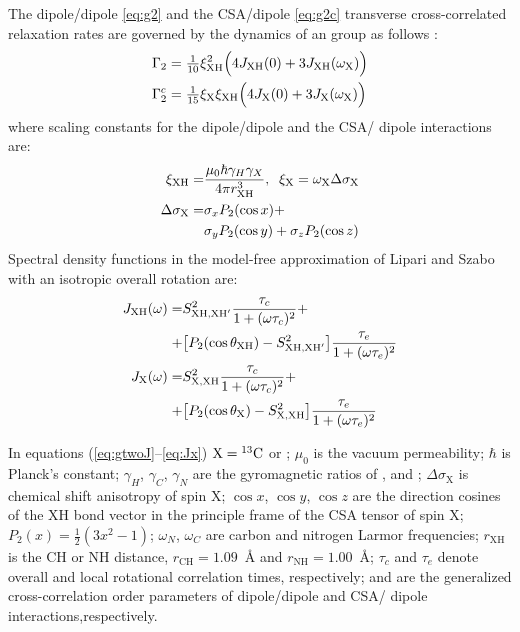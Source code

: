 \documentclass[twocolumn]{svjour3}           %
\begin{document}
The dipole\slash dipole \gtwo{} \eqref{eq:g2} and the 
CSA\slash dipole \gtwoCSA{} \eqref{eq:g2c} transverse 
cross-correlated relaxation rates are governed by the dynamics of an 
\XHtwo{} group as follows 
\cite{yang_study_1998,kumar_cross-correlations_2000,banci_side_2001,zheng_measurement_2004,yang_probing_2011}:
\begin{align}
  \label{eq:gtwoJ}
  \Gamma_2  & = 
    \tfrac{1}{10} \xi_\text{XH}^2
       \Bigl(4 J_{\text{XH}}(0) + 3 J_{\text{XH}}(\omega_\text{X} ) \Bigr )  \\
  \label{eq:gtwoCSAJ}
  \Gamma_2^c & = \tfrac{1}{15} \xi_\text{X} \xi_\text{XH}
    \Bigl(4 J_{\text{X}}(0) + 3 J_{\text{X}}(\omega_\text{X} ) \Bigr )
\end{align}
where scaling constants for the dipole\slash dipole and the CSA\slash 
dipole interactions are:
\begin{align}
  \xi_\text{XH} = &  
     \frac{\mu_0 \hbar \gamma_H \gamma_X }{4 \pi r_\text{XH}^3 }, 
  \thickspace\thickspace 
      \xi_\text{X} = \omega_\text{X} \Delta \sigma_\text{X} \\
  \Delta\sigma_\text{X} = & \sigma_x P_2(\cos x)+\nonumber \\
  & \sigma_y P_2(\cos y) + \sigma_z P_2(\cos z)
\end{align}
Spectral density functions in the model-free approximation of Lipari and Szabo 
\cite{lipari_model-free_1982} with an isotropic 
overall rotation are:
\begin{align}
  \label{eq:Jxh}
    J_{\text{XH}}(\omega)  = & S^2_{\text{XH,XH}'}\frac{ \tau_c}{1 + (\omega \tau_c)^2} 
     + \nonumber \\
     + & \bigl[ P_2(\cos\theta_\text{XH})-S^2_{\text{XH,XH}'}\bigr]
     \frac{\tau_e}{1+(\omega\tau_e)^2}\\
  \label{eq:Jx}
    J_{\text{X}}(\omega)  = & S^2_\text{X,XH} \frac{\tau_c}{1 + (\omega \tau_c)^2} 
    + \nonumber \\
    + & \bigl[ P_2(\cos\theta_\text{X})-S^2_\text{X,XH}\bigr]
     \frac{\tau_e}{1+(\omega\tau_e)^2}
\end{align}

In equations (\ref{eq:gtwoJ}--\ref{eq:Jx}) $\text{X} ={}^{13}\text{C}$ or \nlab;
$\mu_0$ is the vacuum permeability; 
$\hbar$ is Planck's constant; 
$\gamma_H$, $\gamma_C$, $\gamma_N$ are the gyromagnetic ratios of
  \hlab{}, \clab{} and \nlab;
$\Delta\sigma_\text{X}$ is chemical shift anisotropy of spin X;
$\cos x$, $\cos y$, $\cos z$ are the direction 
  cosines of the XH bond vector in the principle frame
  of the CSA tensor of spin X;
$P_2(x) = \tfrac{1}{2}(3x^2-1)$;
$\omega_N$, $\omega_C$ are carbon and nitrogen Larmor frequencies;
$r_\text{XH}$ is the {CH} or {NH} distance, 
$r_\text{CH} = 1.09$~\AA{} and $r_\text{NH} = 1.00$~\AA;
$\tau_c$ and $\tau_e$ denote overall and local rotational 
  correlation times, respectively; 
\StwoXHp{} and \StwoXXH{} are the generalized cross-correlation 
  order parameters of dipole\slash dipole and CSA\slash 
  dipole interactions,respectively.
\end{document}
